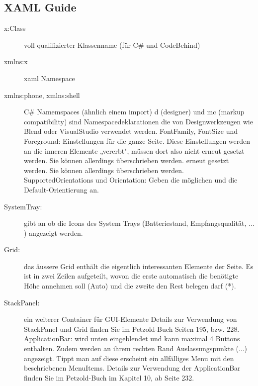 \documentclass[a4paper,10pt]{scrreprt}
\begin{document}
\subsection{XAML Guide}
\begin{description}

\item [x:Class] voll qualifizierter Klassenname (für C\# und CodeBehind)
\item [xmlns:x] xaml Namespace
\item [xmlns:phone, xmlns:shell] C\# Namemspaces (ähnlich einem import)
d (designer) und mc (markup compatibility) sind Namespacedeklarationen die von
Designwerkzeugen wie Blend oder VisualStudio verwendet werden.
FontFamily, FontSize und Foreground: Einstellungen für die ganze Seite. Diese
Einstellungen werden an die inneren Elemente „vererbt", müssen dort also nicht
erneut gesetzt werden. Sie können allerdings überschrieben werden.
erneut gesetzt werden. Sie können allerdings überschrieben werden.
SupportedOrientations und Orientation: Geben die möglichen und die Default-Orientierung an.
\item[SystemTray:] gibt an ob die Icons des System Trays (Batteriestand, Empfangsqualität, ... ) angezeigt werden.
\item[Grid:] das äussere Grid enthält die eigentlich interessanten Elemente der Seite. Es ist in zwei Zeilen aufgeteilt,
wovon die erste automatisch die benötigte Höhe annehmen soll (Auto) und die zweite den Rest belegen
darf (*).
\item[StackPanel:] ein weiterer Container für GUI-Elemente
Details zur Verwendung von StackPanel und Grid finden Sie im Petzold-Buch Seiten 195, bzw. 228.
ApplicationBar: wird unten eingeblendet und kann maximal 4 Buttons enthalten. Zudem werden an ihrem
rechten Rand Auslassungspunkte (...) angezeigt. Tippt man auf diese erscheint ein allfälliges Menu mit
den beschriebenen MenuItems.
Details zur Verwendung der ApplicationBar finden Sie im Petzold-Buch im Kapitel 10, ab Seite 232.
\end{description}
\end{document}
